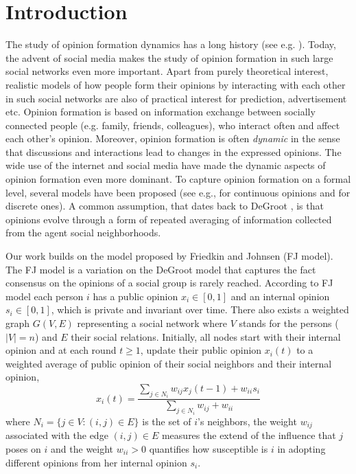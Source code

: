 \section{Introduction}

The study of opinion formation dynamics has a long history (see e.g.
\cite{Jackson}).  Today, the advent of social media makes the study of opinion
formation in such large social networks even more important.  Apart from purely
theoretical interest, realistic models of how people form their opinions by
interacting with each other in such social networks are also of practical
interest for prediction, advertisement etc.  Opinion formation is based on
information exchange between socially connected people (e.g. family, friends,
colleagues), who interact often and affect each other's opinion.  Moreover,
opinion formation is often \emph{dynamic} in the sense that discussions and
interactions lead to changes in the expressed opinions. The wide use of the
internet and social media have made the dynamic aspects of opinion formation
even more dominant.  To capture opinion formation on a formal level, several
models have been proposed (see e.g., \cite{DeGroot,FJ90,HK,BKO11} for
continuous opinions and \cite{FGV12,YOASS13,BFM16} for discrete ones).  A
common assumption, that dates back to DeGroot \cite{DeGroot}, is that opinions
evolve through a form of repeated averaging of information collected from the
agent social neighborhoods.

Our work builds on the model proposed by Friedkin and Johnsen \cite{FJ90}(FJ
model).  The FJ model is a variation on the DeGroot model that captures the
fact consensus on the opinions of a social group is rarely reached.
According to FJ model each person $i$ has a public opinion $x_i \in [0,1]$
and an internal opinion $s_i\in [0,1]$, which is private and invariant 
over time. There also exists a weighted graph $G(V,E)$ representing a social
network where $V$ stands for the persons ($|V|=n$) and $E$ their social  
relations. Initially, all nodes start with their internal opinion and 
at each round $t\geq1$, update their public opinion $x_i(t)$ to a weighted 
average of public opinion of their social neighbors and their internal opinion,
%
\begin{equation}\label{eq:FJ_model}
  x_i(t)= \frac{\sum_{j\in N_i}w_{ij}x_j(t-1) + w_{ii}s_i}{\sum_{j\in
      N_i}w_{ij}+w_{ii}}
\end{equation}
%
where $N_i =\{j \in V:(i,j) \in E\}$ is the set of $i$'s neighbors, 
the weight $w_{ij}$ associated with the edge $(i,j) \in E$ measures the extend
of the influence that $j$ poses on $i$ and the weight $w_{ii}>0$ quantifies how susceptible
is $i$ in adopting different opinions from her internal opinion $s_i$.

